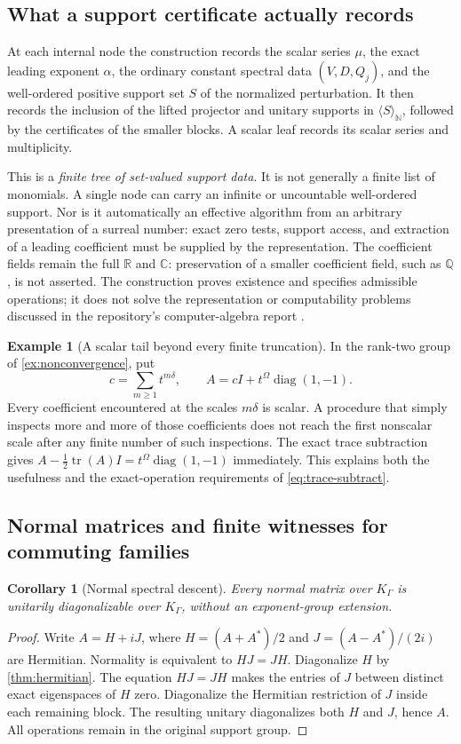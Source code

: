 \documentclass[11pt,letterpaper]{article}
\numberwithin{equation}{section}
\newtheorem{corollary}[theorem]{Corollary}
\theoremstyle{definition}
\newtheorem{example}[theorem]{Example}
\theoremstyle{remark}
\newcommand{\R}{\mathbb R}
\newcommand{\C}{\mathbb C}
\newcommand{\Q}{\mathbb Q}
\newcommand{\N}{\mathbb N}
\newcommand{\diag}{\operatorname{diag}}
\newcommand{\tr}{\operatorname{tr}}
\newcommand{\ang}[1]{\langle#1\rangle}
\newcommand{\KG}{K_{\Gamma}}
\begin{document}
\subsection{What a support certificate actually records}

At each internal node the construction records the scalar series $\mu$,
the exact leading exponent $\alpha$, the ordinary constant spectral data
$(V,D,Q_j)$, and the well-ordered positive support set $S$ of the normalized
perturbation. It then records the inclusion of the lifted projector and
unitary supports in $\ang{S}_{\N}$, followed by the certificates of the smaller
blocks. A scalar leaf records its scalar series and multiplicity.

This is a \emph{finite tree of set-valued support data}. It is not generally
a finite list of monomials. A single node can carry an infinite or
uncountable well-ordered support. Nor is it automatically an effective
algorithm from an arbitrary presentation of a surreal number: exact zero
tests, support access, and extraction of a leading coefficient must be
supplied by the representation. The coefficient fields remain the full $\R$ and $\C$: preservation of a
smaller coefficient field, such as $\Q$, is not asserted. The construction
proves existence and specifies admissible operations; it does not solve the representation or
computability problems discussed in the repository's computer-algebra report
\cite{RepoCAS}.

\begin{example}[A scalar tail beyond every finite truncation]\label{ex:tail}
In the rank-two group of \cref{ex:nonconvergence}, put
\[
 c=\sum_{m\ge1}t^{m\delta},\qquad
 A=cI+t^\Omega\diag(1,-1).
\]
Every coefficient encountered at the scales $m\delta$ is scalar. A procedure
that simply inspects more and more of those coefficients does not reach the
first nonscalar scale after any finite number of such inspections. The
exact trace subtraction gives $A-\tfrac12\tr(A)I=t^\Omega\diag(1,-1)$
immediately. This explains both the usefulness and the exact-operation
requirements of \cref{eq:trace-subtract}.
\end{example}

\subsection{Normal matrices and finite witnesses for commuting families}

\begin{corollary}[Normal spectral descent]\label{cor:normal}
Every normal matrix over $\KG$ is unitarily diagonalizable over $\KG$, without
an exponent-group extension.
\end{corollary}
\begin{proof}
Write $A=H+iJ$, where $H=(A+A^*)/2$ and $J=(A-A^*)/(2i)$ are Hermitian.
Normality is equivalent to $HJ=JH$. Diagonalize $H$ by
\cref{thm:hermitian}. The equation $HJ=JH$ makes the entries of $J$ between
distinct exact eigenspaces of $H$ zero. Diagonalize the Hermitian restriction
of $J$ inside each remaining block. The resulting unitary diagonalizes both
$H$ and $J$, hence $A$. All operations remain in the original support group.
\end{proof}
\end{document}
